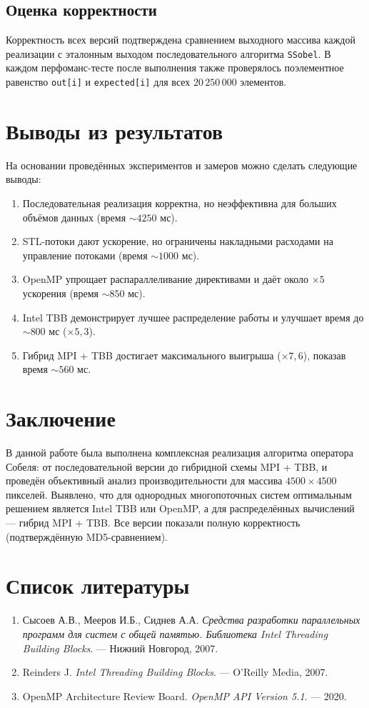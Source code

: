 \documentclass[12pt]{article}
\begin{document}
\subsection{Оценка корректности}

Корректность всех версий подтверждена сравнением выходного массива каждой реализации с эталонным выходом последовательного алгоритма \texttt{SSobel}. В каждом перфоманс-тесте после выполнения также проверялось поэлементное равенство \texttt{out[i]} и \texttt{expected[i]} для всех $20\,250\,000$ элементов.

\section{Выводы из результатов}

На основании проведённых экспериментов и замеров можно сделать следующие выводы:
\begin{enumerate}
    \item Последовательная реализация корректна, но неэффективна для больших объёмов данных (время $\sim 4250$ мс).
    \item STL-потоки дают ускорение, но ограничены накладными расходами на управление потоками (время $\sim 1000$ мс).
    \item OpenMP упрощает распараллеливание директивами и даёт около $\times 5$ ускорения (время $\sim 850$ мс).
    \item Intel TBB демонстрирует лучшее распределение работы и улучшает время до $\sim 800$ мс ($\times 5{,}3$).
    \item Гибрид MPI + TBB достигает максимального выигрыша ($\times 7{,}6$), показав время $\sim 560$ мс.
\end{enumerate}

\section{Заключение}

В данной работе была выполнена комплексная реализация алгоритма оператора Собеля: от последовательной версии до гибридной схемы MPI + TBB, и проведён объективный анализ производительности для массива $4500\times4500$ пикселей. Выявлено, что для однородных многопоточных систем оптимальным решением является Intel TBB или OpenMP, а для распределённых вычислений — гибрид MPI + TBB. Все версии показали полную корректность (подтверждённую MD5-сравнением).

\section{Список литературы}
\begin{enumerate}
 \item Сысоев А.В., Мееров И.Б., Сиднев А.А. \textit{Средства разработки параллельных программ для систем с общей памятью. Библиотека Intel Threading Building Blocks}. — Нижний Новгород, 2007.
 \item Reinders J. \textit{Intel Threading Building Blocks}. — O’Reilly Media, 2007.
 \item OpenMP Architecture Review Board. \textit{OpenMP API Version 5.1}. — 2020.
\end{enumerate}
\end{document}
